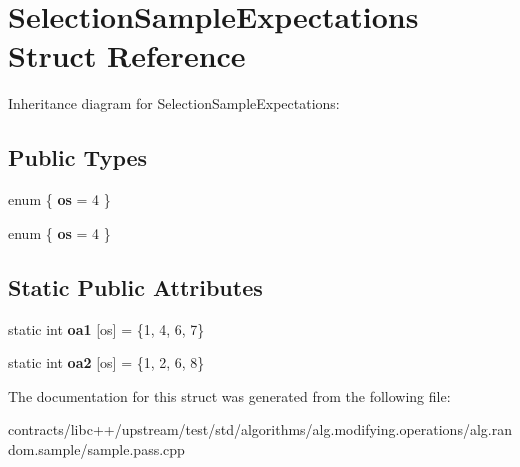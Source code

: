 \hypertarget{struct_selection_sample_expectations}{}\section{Selection\+Sample\+Expectations Struct Reference}
\label{struct_selection_sample_expectations}


Inheritance diagram for Selection\+Sample\+Expectations\+:
\subsection*{Public Types}
\begin{DoxyCompactItemize}
\item 
\mbox{\label{struct_selection_sample_expectations_ad84def5fe756c4a0e554f47188c49bc1}} 
enum \{ {\bfseries os} = 4
 \}
\item 
\mbox{\label{struct_selection_sample_expectations_a75be29f6025e0988f49a3bd2370a0877}} 
enum \{ {\bfseries os} = 4
 \}
\end{DoxyCompactItemize}
\subsection*{Static Public Attributes}
\begin{DoxyCompactItemize}
\item 
\mbox{\label{struct_selection_sample_expectations_aed29340f7b192f45ffd839a0f4025033}} 
static int {\bfseries oa1} \mbox{[}os\mbox{]} = \{1, 4, 6, 7\}
\item 
\mbox{\label{struct_selection_sample_expectations_aef6cb2de4abda85b4baab0fecbcdedb2}} 
static int {\bfseries oa2} \mbox{[}os\mbox{]} = \{1, 2, 6, 8\}
\end{DoxyCompactItemize}


The documentation for this struct was generated from the following file\+:\begin{DoxyCompactItemize}
\item 
contracts/libc++/upstream/test/std/algorithms/alg.\+modifying.\+operations/alg.\+random.\+sample/sample.\+pass.\+cpp\end{DoxyCompactItemize}
